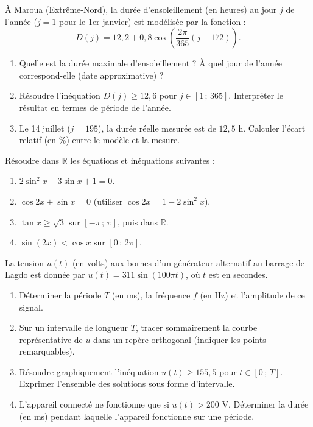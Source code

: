 \documentclass[11pt]{article}
\begin{document}
\begin{exercice}
À Maroua (Extrême-Nord), la durée d'ensoleillement (en heures) au jour $j$ de l'année ($j=1$ pour le 1er janvier) est modélisée par la fonction :
$$D(j) = 12,2 + 0,8\cos\left(\frac{2\pi}{365}(j - 172)\right).$$
\begin{enumerate}
    \item Quelle est la durée maximale d'ensoleillement ? À quel jour de l'année correspond-elle (date approximative) ?
    \item Résoudre l'inéquation $D(j) \geq 12,6$ pour $j\in[1\,;\,365]$. Interpréter le résultat en termes de période de l'année.
    \item Le 14 juillet ($j=195$), la durée réelle mesurée est de $12,5$ h. Calculer l'écart relatif (en \%) entre le modèle et la mesure.
\end{enumerate}
\end{exercice}

\begin{exercice}
Résoudre dans $\mathbb{R}$ les équations et inéquations suivantes :
\begin{enumerate}
    \item $2\sin^2 x - 3\sin x + 1 = 0$.
    \item $\cos 2x + \sin x = 0$ (utiliser $\cos 2x = 1 - 2\sin^2 x$).
    \item $\tan x \geq \sqrt{3}$ sur $\left[-\pi\,;\,\pi\right]$, puis dans $\mathbb{R}$.
    \item $\sin(2x) < \cos x$ sur $\left[0\,;\,2\pi\right]$.
\end{enumerate}
\end{exercice}

\begin{exercice}
La tension $u(t)$ (en volts) aux bornes d'un générateur alternatif au barrage de Lagdo est donnée par $u(t) = 311\sin(100\pi t)$, où $t$ est en secondes.
\begin{enumerate}
    \item Déterminer la période $T$ (en ms), la fréquence $f$ (en Hz) et l'amplitude de ce signal.
    \item Sur un intervalle de longueur $T$, tracer sommairement la courbe représentative de $u$ dans un repère orthogonal (indiquer les points remarquables).
    \item Résoudre graphiquement l'inéquation $u(t) \geq 155,5$ pour $t\in[0\,;\,T]$. Exprimer l'ensemble des solutions sous forme d'intervalle.
    \item L'appareil connecté ne fonctionne que si $u(t) > 200$ V. Déterminer la durée (en ms) pendant laquelle l'appareil fonctionne sur une période.
\end{enumerate}
\end{exercice}
\end{document}

